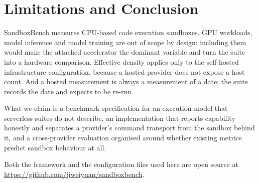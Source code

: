 \section{Limitations and Conclusion}
\label{sec:conclusion}

SandboxBench measures CPU-based code execution sandboxes. GPU workloads,
model inference and model training are out of scope by design: including them
would make the attached accelerator the dominant variable and turn the suite
into a hardware comparison. Effective density applies only to the
self-hosted infrastructure configuration, because a hosted provider does not
expose a host count. And a hosted measurement is always a measurement of a
date; the suite records the date and expects to be re-run.

What we claim is a benchmark specification for an execution model that
serverless suites do not describe, an implementation that reports capability
honestly and separates a provider's command transport from the sandbox behind
it, and a cross-provider evaluation organised around whether existing metrics
predict sandbox behaviour at all. 

Both the framework and the configuration files used here are open source at
\url{https://github.com/jiweiyuan/sandboxbench}.
